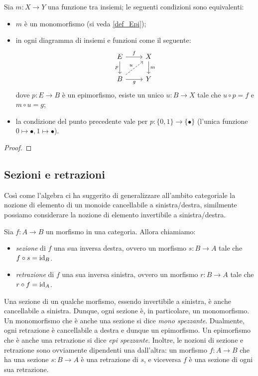 \begin{proposition}
Sia $m : X\to Y$ una funzione tra insiemi; le seguenti condizioni sono equivalenti:
\begin{itemize}
  \item $m$ è un monomorfismo (si veda \ref{def_Epi});
  \item in ogni diagramma di insiemi e funzioni come il seguente: 
    \[\begin{tikzcd}
      E \ar[r, "f"]\ar[d, "p"']& X \ar[d, "m"]\\ 
      B \ar[r, "g"'] \ar[ur, dashed, "u"]& Y
    \end{tikzcd}\]
    dove $p : E\to B$ è un epimorfismo, esiste un unico $u : B\to X$ tale che $u\circ p = f$ e $m\circ u = g$; 
  \item la condizione del punto precedente vale per $p : \{0,1\} \to \{\bullet\}$ (l'unica funzione $0\mapsto\bullet, 1\mapsto\bullet$).
\end{itemize}
\end{proposition}
\begin{proof}
  \Todo{}
\end{proof}

\subsection{Sezioni e retrazioni}\label{sec_sezretraz}
Così come l'algebra ci ha suggerito di generalizzare all'ambito categoriale la nozione di elemento di un monoide cancellabile a sinistra/destra,
similmente possiamo considerare la nozione di elemento invertibile a sinistra/destra.

\begin{definition}
	Sia \(f \colon A \to B\) un morfismo in una categoria.
	Allora chiamiamo:
	\begin{itemize}
		\item \emph{sezione} di \(f\) una sua inversa destra, ovvero un morfismo \(s \colon B \to A\) tale che \(f \circ s = \mathrm{id}_{B}\).
		\item \emph{retrazione} di \(f\) una sua inversa sinistra, ovvero un morfismo \(r \colon B \to A\) tale che \(r \circ f = \mathrm{id}_{A}\).
	\end{itemize}
\end{definition}
\begin{remark}
	Una sezione di un qualche morfismo, essendo invertibile a sinistra, è anche cancellabile a sinistra.
	Dunque, ogni sezione è, in particolare, un monomorfismo.
	Un monomorfismo che è anche una sezione si dice \emph{mono spezzante}.
	Dualmente, ogni retrazione è cancellabile a destra e dunque un epimorfismo.
	Un epimorfismo che è anche una retrazione si dice \emph{epi spezzante}.
	Inoltre, le nozioni di sezione e retrazione sono ovviamente dipendenti una dall'altra:
	un morfismo \(f : A \to B\) che ha una sezione \(s : B\to A\) è una retrazione di \(s\),
	e viceversa \(f\) è una sezione di ogni sua retrazione.
\end{remark}

